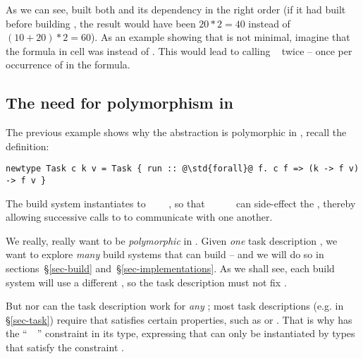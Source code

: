 \noindent
As we can see,  built both  and its dependency  in the
right order (if it had built  before building , the result would
have been $20 * 2 = 40$ instead of $(10 + 20) * 2 = 60$). As an example showing
that  is not minimal, imagine that the formula in cell  was
 instead of . This would lead to calling
~ twice -- once per occurrence of  in the
formula.

\subsection{The need for polymorphism in }\label{sec-why-polymorphism}

The previous example shows why the  abstraction is polymorphic in , recall the definition:

\begin{verbatim}
newtype Task c k v = Task { run :: @\std{forall}@ f. c f => (k -> f v) -> f v }
\end{verbatim}

\noindent
The  build system instantiates  to
~~~~,
so that ~\hs{::}~~\hs{->}~~ can side-effect the
, thereby allowing successive calls to  to communicate with
one another.

We really, really want  to be \emph{polymorphic} in .
Given \emph{one} task description , we want to explore \emph{many} build
systems that can build  -- and we will do so in sections~\S\ref{sec-build}
and~\S\ref{sec-implementations}. As we shall see, each build system will use a
different , so the task description must not fix .

But nor can the task description work for \emph{any} ; most task
descriptions (e.g.  in \S\ref{sec-task}) require that 
satisfies certain properties, such as  or . That is
why  has the ``~~\hs{=>}'' constraint in its type,
expressing that  can only be instantiated by types that satisfy the
constraint .

